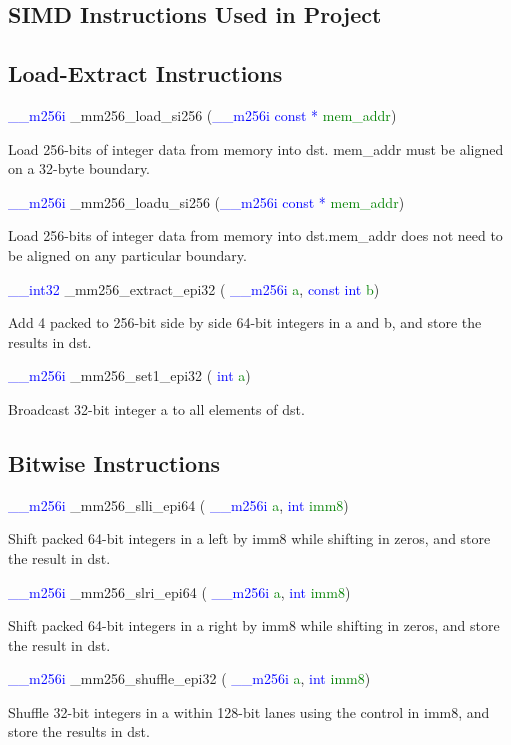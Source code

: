 \documentclass[11pt,oneside,a4paper]{article}
\makeatletter
\def\cleardoublepage{\clearpage\if@twoside \ifodd\c@page\else%
\hbox{}%
\thispagestyle{empty}%
\clearpage%
\if@twocolumn\hbox{}\clearpage\fi\fi\fi}
\makeatother
\begin{document}
\cleardoublepage




\begin{appendices}
\section{SIMD Instructions Used in Project}
\subsection{Load-Extract Instructions}
\textcolor{blue}{\_\_m256i} \_mm256\_load\_si256 (\textcolor{blue}{\_\_m256i const *} \textcolor{green}{mem\_addr})
\par Load 256-bits of integer data from memory into dst. mem\_addr must be aligned on a 32-byte boundary.
\par
\textcolor{blue}{\_\_m256i} \_mm256\_loadu\_si256 (\textcolor{blue}{\_\_m256i const *} \textcolor{green}{mem\_addr})
\par Load 256-bits of integer data from memory into dst.mem\_addr does not need to be aligned on any particular boundary.
\par
\textcolor{blue}{ \_\_int32} \_mm256\_extract\_epi32 ( \textcolor{blue}{ \_\_m256i} \textcolor{green}{a}, \textcolor{blue}{const int} \textcolor{green}{b})
\par Add 4 packed to 256-bit side by side 64-bit integers in a and b, and store the results in dst.
\par
\textcolor{blue}{ \_\_m256i} \_mm256\_set1\_epi32 ( \textcolor{blue}{ int} \textcolor{green}{a})
\par Broadcast 32-bit integer a to all elements of dst.
\par 
\subsection{Bitwise Instructions}
\textcolor{blue}{ \_\_m256i} \_mm256\_slli\_epi64 ( \textcolor{blue}{ \_\_m256i} \textcolor{green}{a}, \textcolor{blue}{int} \textcolor{green}{imm8})
\par Shift packed 64-bit integers in a left by imm8 while shifting in zeros, and store the result in dst.
\par
\textcolor{blue}{ \_\_m256i} \_mm256\_slri\_epi64 ( \textcolor{blue}{ \_\_m256i} \textcolor{green}{a}, \textcolor{blue}{int} \textcolor{green}{imm8})
\par Shift packed 64-bit integers in a right by imm8 while shifting in zeros, and store the result in dst.
\par
\textcolor{blue}{ \_\_m256i} \_mm256\_shuffle\_epi32 ( \textcolor{blue}{ \_\_m256i} \textcolor{green}{a}, \textcolor{blue}{int} \textcolor{green}{imm8})
\par Shuffle 32-bit integers in a within 128-bit lanes using the control in imm8, and store the results in dst.

\end{appendices}
\end{document}
